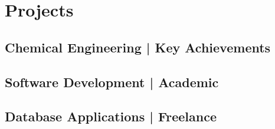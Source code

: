 \section{Projects}%
%
\subsection{Chemical Engineering | Key Achievements}
%

%
\subsection{Software Development | Academic}
%

%
\subsection{Database Applications | Freelance}
%

%
%